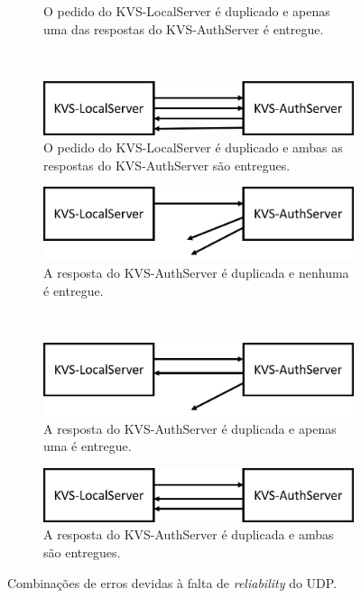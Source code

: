 \begin{figure}[ht]
\begin{subfigure}[b]{0.49\textwidth}
         \caption{O pedido do KVS-LocalServer é duplicado e apenas uma das respostas do KVS-AuthServer é entregue.}
         \label{fig:udp_combo4}
    \end{subfigure}
    \\
    \begin{subfigure}[b]{0.49\textwidth}
         \centering
         \includegraphics[width=\textwidth]{figures/udp_combo5.png}
         \caption{O pedido do KVS-LocalServer é duplicado e ambas as respostas do KVS-AuthServer são entregues.}
         \label{fig:udp_combo5}
    \end{subfigure}
    \hfill
    \begin{subfigure}[b]{0.49\textwidth}
         \centering
         \includegraphics[width=\textwidth]{figures/udp_combo6.png}
         \caption{A resposta do KVS-AuthServer é duplicada e nenhuma é entregue.}
         \label{fig:udp_combo6}
    \end{subfigure}
    \\
    \begin{subfigure}[b]{0.49\textwidth}
         \centering
         \includegraphics[width=\textwidth]{figures/udp_combo7.png}
         \caption{A resposta do KVS-AuthServer é duplicada e apenas uma é entregue.}
         \label{fig:udp_combo7}
    \end{subfigure}
    \hfill
    \begin{subfigure}[b]{0.49\textwidth}
         \centering
         \includegraphics[width=\textwidth]{figures/udp_combo8.png}
         \caption{A resposta do KVS-AuthServer é duplicada e ambas são entregues.}
         \label{fig:udp_combo8}
    \end{subfigure}
    \caption{Combinações de erros devidas à falta de \textit{reliability} do UDP.}
    \label{fig:upd_combos}
\end{figure}

